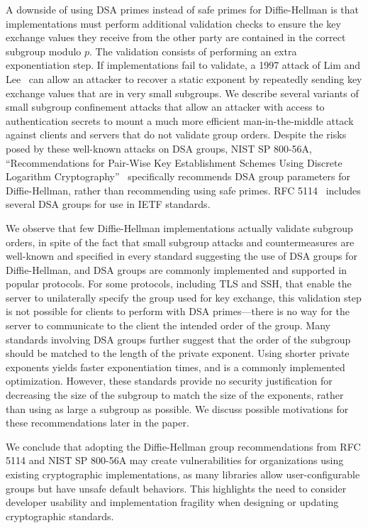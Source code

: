 A downside of using DSA primes instead of safe primes for Diffie-Hellman is
that implementations must perform additional validation checks to ensure the
key exchange values they receive from the other party are contained in the
correct subgroup modulo $p$. The validation consists of performing an extra
exponentiation step. If implementations fail to validate, a 1997 attack of Lim
and Lee~\cite{lim-1997} can allow an attacker to recover a static exponent by
repeatedly sending key exchange values that are in very small subgroups. We
describe several variants of small subgroup confinement attacks that allow an
attacker with access to authentication secrets to mount a much more efficient
man-in-the-middle attack against clients and servers that do not validate group
orders. Despite the risks posed by these well-known attacks on DSA groups, NIST SP 800-56A, ``Recommendations
for Pair-Wise Key Establishment Schemes Using Discrete Logarithm
Cryptography''~\cite{sp800} specifically recommends DSA group parameters
for Diffie-Hellman, rather than recommending using safe primes. RFC
5114~\cite{rfc5114} includes several DSA groups for use in IETF standards.

We observe
that few Diffie-Hellman implementations actually validate subgroup orders, in spite of the fact
that small subgroup attacks and countermeasures are well-known and specified
in every standard suggesting the use of DSA groups for Diffie-Hellman, and DSA
groups are commonly implemented and supported in popular protocols. For some protocols, including
TLS and SSH, that enable the server to unilaterally specify the group used for
key exchange, this validation step is not possible for clients to perform with
DSA primes---there is no way for the server to communicate to the client the
intended order of the group. Many standards involving DSA groups further
suggest that the order of the subgroup should be matched to the length of the
private exponent.  Using shorter private exponents yields faster exponentiation
times, and is a commonly implemented optimization. However, these standards
provide no security justification for decreasing the size of the subgroup to
match the size of the exponents, rather than using as large a subgroup as
possible. We discuss possible motivations for these recommendations
later in the paper.

We conclude that adopting the Diffie-Hellman group recommendations from RFC
5114 and NIST SP 800-56A may create vulnerabilities for organizations using
existing cryptographic implementations, as many libraries allow
user-configurable groups but have unsafe default behaviors.  This highlights the
need to consider developer usability and implementation fragility when designing
or updating cryptographic standards.

